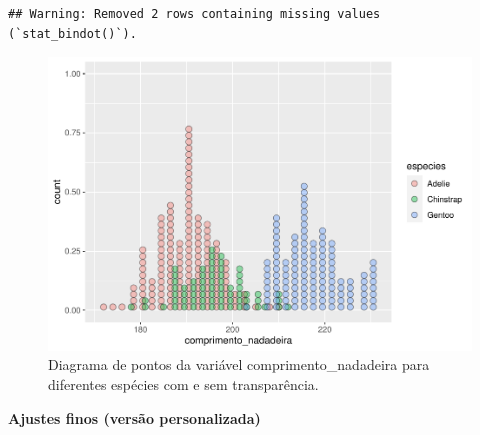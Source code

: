 \documentclass[
]{article}
\begin{document}
\begin{verbatim}
## Warning: Removed 2 rows containing missing values (`stat_bindot()`).
\end{verbatim}

\begin{figure}
\includegraphics[width=0.75\linewidth,height=0.75\textheight]{epr_files/figure-latex/fig-dot-flipper-cat-2} \caption{Diagrama de pontos da variável comprimento_nadadeira para diferentes espécies com e sem transparência.}\label{fig:fig-dot-flipper-cat-2}
\end{figure}

\textbf{Ajustes finos (versão personalizada)}
\end{document}
